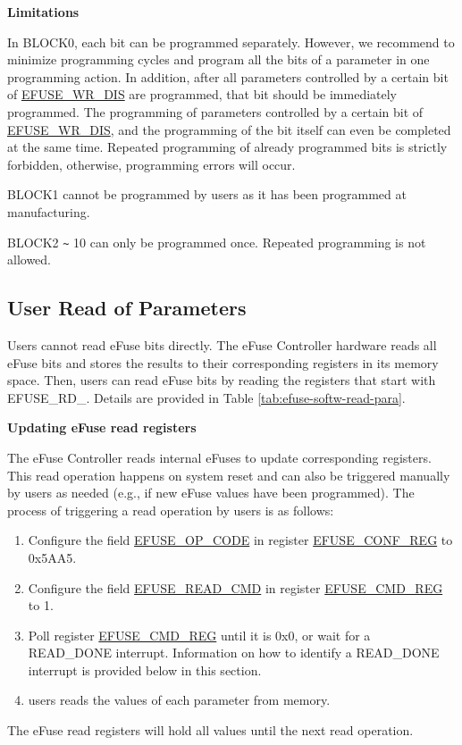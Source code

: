 \documentclass[main\_\_EN.tex]{subfiles}
\begin{document}
{\bfseries Limitations}

In BLOCK0, each bit can be programmed separately. However, we recommend to minimize programming cycles and program all the bits of a parameter in one programming action. In addition, after all parameters controlled by a certain bit of \hyperref[fielddesc:EFUSEWRDIS]{EFUSE\_WR\_DIS} are programmed, that bit should be immediately programmed. The programming of parameters controlled by a certain bit of \hyperref[fielddesc:EFUSEWRDIS]{EFUSE\_WR\_DIS},
and the programming of the bit itself can even be completed at the same time. Repeated programming of already programmed bits is strictly forbidden, otherwise, programming errors will occur.

BLOCK1 cannot be programmed by users as it has been programmed at manufacturing.

BLOCK2 \verb+~+ 10 can only be programmed once. Repeated programming is not allowed.

\subsection{User Read of Parameters}
\label{sec:efuse-software-read-para}

Users cannot read eFuse bits directly. The eFuse Controller hardware reads all eFuse bits and stores the results to their corresponding registers in its memory space. Then, users can read eFuse bits by reading the registers that start with EFUSE\_RD\_. Details are provided in Table \ref{tab:efuse-softw-read-para}.



{\bfseries Updating eFuse read registers}
\label{sec:efuse-update-reg}

The eFuse Controller reads internal eFuses to update corresponding registers. This read operation happens on system reset and can also be triggered manually by users as needed (e.g., if new eFuse values have been programmed). The process of triggering a read operation by users is as follows:

\begin{enumerate}
    \item Configure the field \hyperref[fielddesc:EFUSEOPCODE]{EFUSE\_OP\_CODE} in register \hyperref[regdesc:EFUSECONFREG]{EFUSE\_CONF\_REG} to 0x{}5AA5.
    \item Configure the field \hyperref[fielddesc:EFUSEREADCMD]{EFUSE\_READ\_CMD} in register \hyperref[regdesc:EFUSECMDREG]{EFUSE\_CMD\_REG} to 1.
    \item Poll register \hyperref[regdesc:EFUSECMDREG]{EFUSE\_CMD\_REG} until it is 0x{}0, or wait for a READ\_DONE interrupt. Information on how to identify a READ\_DONE interrupt is provided below in this section.
    \item users reads the values of each parameter from memory.
\end{enumerate}
The eFuse read registers will hold all values until the next read operation.
\end{document}
